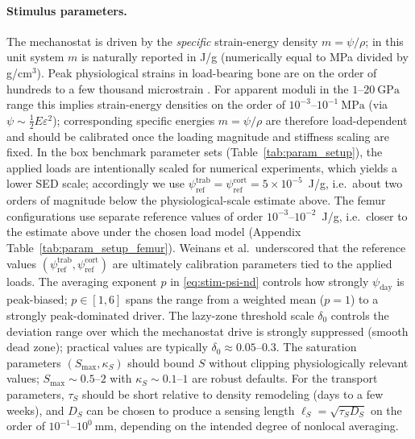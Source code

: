 \paragraph{Stimulus parameters.}
The mechanostat is driven by the \emph{specific} strain-energy density $m=\psi/\rho$; in this unit system $m$ is naturally reported in J/g (numerically equal to MPa divided by g/cm$^3$).
Peak physiological strains in load-bearing bone are on the order of hundreds to a few thousand microstrain \cite{Turner1998_ThreeRulesBone,Robling2006}.
For apparent moduli in the $1$--$20~\mathrm{GPa}$ range this implies strain-energy densities on the order of $10^{-3}$--$10^{-1}~\mathrm{MPa}$ (via $\psi\sim\tfrac12 E\varepsilon^2$); corresponding specific energies $m=\psi/\rho$ are therefore load-dependent and should be calibrated once the loading magnitude and stiffness scaling are fixed.
In the box benchmark parameter sets (Table~\ref{tab:param_setup}), the applied loads are intentionally scaled for numerical experiments, which yields a lower SED scale; accordingly we use $\psi_{\mathrm{ref}}^{\mathrm{trab}}=\psi_{\mathrm{ref}}^{\mathrm{cort}}=5\times 10^{-5}$~J/g, i.e.\ about two orders of magnitude below the physiological-scale estimate above.
The femur configurations use separate reference values of order $10^{-3}$--$10^{-2}$~J/g, i.e.\ closer to the estimate above under the chosen load model (Appendix Table~\ref{tab:param_setup_femur}).
Weinans et al.\ underscored that the reference values $(\psi_{\mathrm{ref}}^{\mathrm{trab}},\psi_{\mathrm{ref}}^{\mathrm{cort}})$ are ultimately calibration parameters tied to the applied loads.
The averaging exponent $p$ in \eqref{eq:stim-psi-nd} controls how strongly $\psi_{\mathrm{day}}$ is peak-biased; $p\in[1,6]$ spans the range from a weighted mean ($p=1$) to a strongly peak-dominated driver.
The lazy-zone threshold scale $\delta_0$ controls the deviation range over which the mechanostat drive is strongly suppressed (smooth dead zone); practical values are typically $\delta_0\approx 0.05$--$0.3$.
The saturation parameters $(S_{\max},\kappa_S)$ should bound $S$ without clipping physiologically relevant values; $S_{\max}\sim 0.5$--$2$ with $\kappa_S\sim 0.1$--$1$ are robust defaults.
For the transport parameters, $\tau_S$ should be short relative to density remodeling (days to a few weeks), and $D_S$ can be chosen to produce a sensing length $\ell_S=\sqrt{\tau_S D_S}$ on the order of $10^{-1}$--$10^{0}~\mathrm{mm}$, depending on the intended degree of nonlocal averaging.

